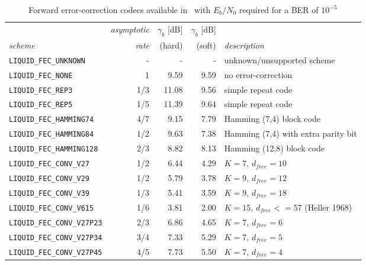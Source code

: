 \begin{table*}
\caption{Forward error-correction codecs available in \liquid\
         with $E_b/N_0$ required for a BER of $10^{-5}$}
\label{tab:fec:codecs}
\centering
{\small
\begin{tabular*}{0.95\textwidth}{l@{\extracolsep{\fill}}rrrl}
\toprule
             & {\it asymptotic} & {\it $\gamma_b$} [dB] & {\it $\gamma_b$} [dB] & \\
{\it scheme} & {\it rate}       & (hard)                & (soft)                & {\it description}\\\otoprule
%
{\tt LIQUID\_FEC\_UNKNOWN}      & -       &     - &     - & unknown/unsupported scheme\\
{\tt LIQUID\_FEC\_NONE}         & 1       &  9.59 &  9.59 & no error-correction\\
{\tt LIQUID\_FEC\_REP3}         & 1/3     & 11.08 &  9.56 & simple repeat code\\
{\tt LIQUID\_FEC\_REP5}         & 1/5     & 11.39 &  9.64 & simple repeat code\\
{\tt LIQUID\_FEC\_HAMMING74}    & 4/7     &  9.15 &  7.79 & Hamming (7,4) block code\\
{\tt LIQUID\_FEC\_HAMMING84}    & 1/2     &  9.63 &  7.38 & Hamming (7,4) with extra parity bit\\
{\tt LIQUID\_FEC\_HAMMING128}   & 2/3     &  8.82 &  8.13 & Hamming (12,8) block code\\\midrule
%
{\tt LIQUID\_FEC\_CONV\_V27}    & 1/2     &  6.44 & 4.29 & $K=7$, $d_{free}=10$\\
{\tt LIQUID\_FEC\_CONV\_V29}    & 1/2     &  5.79 & 3.78 & $K=9$, $d_{free}=12$\\
{\tt LIQUID\_FEC\_CONV\_V39}    & 1/3     &  5.41 & 3.59 & $K=9$, $d_{free}=18$\\
{\tt LIQUID\_FEC\_CONV\_V615}   & 1/6     &  3.81 & 2.00 & $K=15$, $d_{free}<=57$ (Heller 1968)\\\midrule
%
{\tt LIQUID\_FEC\_CONV\_V27P23} & 2/3     &  6.86 & 4.65 & $K=7$, $d_{free}=6$\\
{\tt LIQUID\_FEC\_CONV\_V27P34} & 3/4     &  7.33 & 5.29 & $K=7$, $d_{free}=5$\\
{\tt LIQUID\_FEC\_CONV\_V27P45} & 4/5     &  7.73 & 5.50 & $K=7$, $d_{free}=4$\\

\end{tabular*}}
\end{table*}
